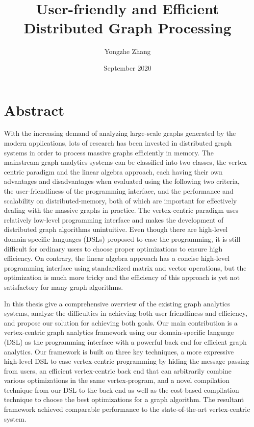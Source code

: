 \documentclass{sokendai_thesis} %
\title{User-friendly and Efficient Distributed Graph Processing}
\author{Yongzhe Zhang}
\date{September 2020}
\begin{document}
\frontmatter
\maketitle


\chapter*{Abstract}

With the increasing demand of analyzing large-scale graphs generated by the modern applications, lots of research has been invested in distributed graph systems in order to process massive graphs efficiently in memory. The mainstream graph analytics systems can be classified into two classes, the vertex-centric paradigm and the linear algebra approach, each having their own advantages and disadvantages when evaluated using the following two criteria, the user-friendliness of the programming interface, and the performance and scalability on distributed-memory, both of which are important for effectively dealing with the massive graphs in practice. The vertex-centric paradigm uses relatively low-level programming interface and makes the development of distributed graph algorithms unintuitive. Even though there are high-level domain-specific languages (DSLs) proposed to ease the programming, it is still difficult for ordinary users to choose proper optimizations to ensure high efficiency. On contrary, the linear algebra approach has a concise high-level programming interface using standardized matrix and vector operations, but the optimization is much more tricky and the efficiency of this approach is yet not satisfactory for many graph algorithms.

In this thesis give a comprehensive overview of the existing graph analytics systems, analyze the difficulties in achieving both user-friendliness and efficiency, and propose our solution for achieving both goals. Our main contribution is a vertex-centric graph analytics framework using our domain-specific language (DSL) as the programming interface with a powerful back end for efficient graph analytics. Our framework is built on three key techniques, a more expressive high-level DSL to ease vertex-centric programming by hiding the message passing from users, an efficient vertex-centric back end that can arbitrarily combine various optimizations in the same vertex-program, and a novel compilation technique from our DSL to the back end as well as the cost-based compilation technique to choose the best optimizations for a graph algorithm. The resultant framework achieved comparable performance to the state-of-the-art vertex-centric system.
\end{document}
